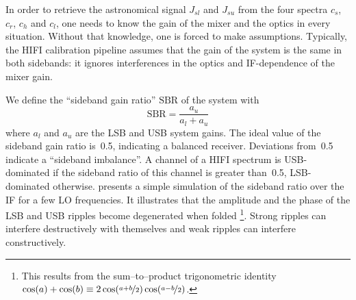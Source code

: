 In order to retrieve the astronomical signal $J_{sl}$ and  $J_{su}$
from the four spectra $c_s$, $c_r$, $c_h$ and $c_l$, one needs to know the gain of the mixer and the optics in every situation.
Without that knowledge, one is forced to make assumptions.
Typically, the HIFI calibration pipeline assumes that the gain of the system is the same in both sidebands: it ignores interferences in the optics and IF-dependence of the mixer gain.

We define the ``sideband gain ratio'' $\text{SBR}$ of the system with
\begin{equation}
    \text{SBR} = \frac{a_u}{a_l + a_u} \label{eq:sbr}
\end{equation}
where $a_l$ and $a_u$ are the LSB and USB system gains.
The ideal value of the sideband gain ratio is~\num{0.5}, indicating a balanced receiver.
Deviations from~\num{0.5} indicate a ``sideband imbalance''.
A channel of a HIFI spectrum is USB-dominated if the sideband ratio of this channel is greater than~\num{0.5}, LSB-dominated otherwise.
 presents a simple simulation of the sideband ratio over the IF for a few LO frequencies.
It illustrates that the amplitude and the phase of the LSB and USB ripples become degenerated when folded \footnote{This results from the sum--to--product trigonometric identity
$\cos(a)+\cos(b) \equiv 2 \cos(\nicefrac{a+b}{2}) \cos(\nicefrac{a-b}{2})$.}.
Strong ripples can interfere destructively with themselves and weak ripples can interfere constructively.

